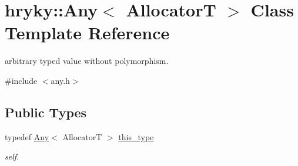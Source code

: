 \hypertarget{classhryky_1_1_any}{\section{hryky\-:\-:Any$<$ Allocator\-T $>$ Class Template Reference}
\label{classhryky_1_1_any}
}


arbitrary typed value without polymorphism.  




{\ttfamily \#include $<$any.\-h$>$}

\subsection*{Public Types}
\begin{DoxyCompactItemize}
\item 
\hypertarget{classhryky_1_1_any_accb3d649460111ed6f04293f3e5865bc}{typedef \hyperlink{classhryky_1_1_any}{Any}$<$ Allocator\-T $>$ \hyperlink{classhryky_1_1_any_accb3d649460111ed6f04293f3e5865bc}{this\-\_\-type}}\label{classhryky_1_1_any_accb3d649460111ed6f04293f3e5865bc}

\begin{DoxyCompactList}\small\item\em self. \end{DoxyCompactList}\end{DoxyCompactItemize}
